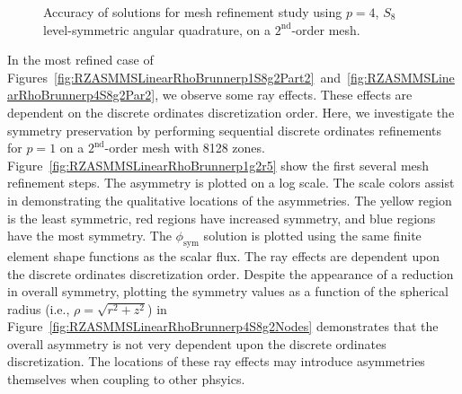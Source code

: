 \documentclass[12pt]{article}
\begin{document}
\begin{figure}[!htb]
\centering
{}
\caption{Accuracy of solutions for mesh refinement study using $p=4$, $S_8$ level-symmetric angular quadrature, on a $2^\text{nd}$-order mesh.}
\label{fig:RZASMMSLinearRhoBrunnerp4S8g2Accuracy}
\end{figure}

\FloatBarrier

In the most refined case of Figures~\ref{fig:RZASMMSLinearRhoBrunnerp1S8g2Part2}~and~\ref{fig:RZASMMSLinearRhoBrunnerp4S8g2Par2}, we observe some ray effects. These effects are dependent on the discrete ordinates discretization order. Here, we investigate the symmetry preservation by performing sequential discrete ordinates refinements for $p=1$ on a $2^\text{nd}$-order mesh with 8128 zones. Figure~\ref{fig:RZASMMSLinearRhoBrunnerp1g2r5} show the first several mesh refinement steps. The asymmetry is plotted on a log scale. The scale colors assist in demonstrating the qualitative locations of the asymmetries. The yellow region is the least symmetric, red regions have increased symmetry, and blue regions have the most symmetry. The $\phi_\text{sym}$ solution is plotted using the same finite element shape functions as the scalar flux. The ray effects are dependent upon the discrete ordinates discretization order. Despite the appearance of a reduction in overall symmetry, plotting the symmetry values as a function of the spherical radius (i.e., $\rho=\sqrt{r^2+z^2}$) in Figure~\ref{fig:RZASMMSLinearRhoBrunnerp4S8g2Nodes} demonstrates that the overall asymmetry is not very dependent upon the discrete ordinates discretization. The locations of these ray effects may introduce asymmetries themselves when coupling to other phsyics.
\end{document}
